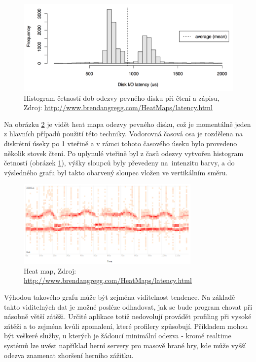 \documentclass[czech,BP]{thesiskiv}
\begin{document}
\begin{figure}[h]
    \centering
    \includegraphics[interpolate,width=1.0\textwidth]{img/prof_histogram.png}
    \caption{Histogram četností dob odezvy pevného disku při čtení a zápisu, Zdroj: \url{http://www.brendangregg.com/HeatMaps/latency.html}}
    \label{obr:heathistoview}
\end{figure}

Na obrázku \ref{obr:heatview} je vidět heat mapa odezvy pevného disku, což je momentálně jeden z hlavních případů použití této techniky. Vodorovná časová osa je rozdělena na diskrétní úseky po 1 vteřině a v rámci tohoto časového úseku bylo provedeno několik stovek čtení. Po uplynulé vteřině byl z časů odezvy vytvořen histogram četností (obrázek \ref{obr:heathistoview}), výšky sloupců byly převedeny na~intenzitu barvy, a do výsledného grafu byl takto obarvený sloupec vložen ve vertikálním směru.

\begin{figure}[h]
    \centering
    \includegraphics[interpolate,width=0.8\textwidth]{img/prof_heatmap.png}
    \caption{Heat map, Zdroj: \url{http://www.brendangregg.com/HeatMaps/latency.html}}
    \label{obr:heatview}
\end{figure}

Výhodou takového grafu může být zejména viditelnost tendence. Na základě takto viditelných dat je možné posléze odhadovat, jak se bude program chovat při násobně větší zátěži. Určité aplikace totiž nedovolují provádět profiling při vysoké zátěži a to zejména kvůli zpomalení, které profilery způsobují. Příkladem mohou být veškeré služby, u kterých je žádoucí minimální odezva - kromě realtime systémů lze uvést například herní servery pro masově hrané hry, kde může vyšší odezva znamenat zhoršení herního zážitku.
\end{document}
